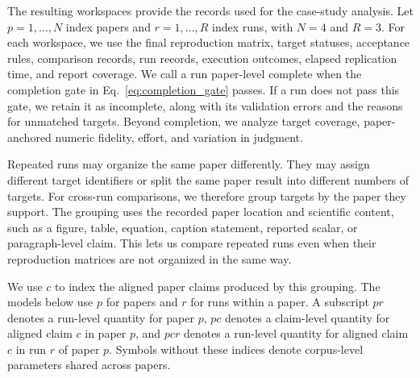 \documentclass[authoryear,5p,times,nopreprintline]{elsarticle}
\begin{document}
The resulting workspaces provide the records used for the case-study analysis.
Let \(p=1,\ldots,N\) index papers and \(r=1,\ldots,R\) index runs, with \(N=4\) and \(R=3\).
For each workspace, we use the final reproduction matrix, target statuses, acceptance rules, comparison records, run records, execution outcomes, elapsed replication time, and report coverage.
We call a run paper-level complete when the completion gate in Eq.~\eqref{eq:completion_gate} passes.
If a run does not pass this gate, we retain it as incomplete, along with its validation errors and the reasons for unmatched targets.
Beyond completion, we analyze target coverage, paper-anchored numeric fidelity, effort, and variation in judgment.

Repeated runs may organize the same paper differently.
They may assign different target identifiers or split the same paper result into different numbers of targets.
For cross-run comparisons, we therefore group targets by the paper they support.
The grouping uses the recorded paper location and scientific content, such as a figure, table, equation, caption statement, reported scalar, or paragraph-level claim.
This lets us compare repeated runs even when their reproduction matrices are not organized in the same way.

We use \(c\) to index the aligned paper claims produced by this grouping.
The models below use \(p\) for papers and \(r\) for runs within a paper.
A subscript \(pr\) denotes a run-level quantity for paper \(p\), \(pc\) denotes a claim-level quantity for aligned claim \(c\) in paper \(p\), and \(pcr\) denotes a run-level quantity for aligned claim \(c\) in run \(r\) of paper \(p\).
Symbols without these indices denote corpus-level parameters shared across papers.
\end{document}

